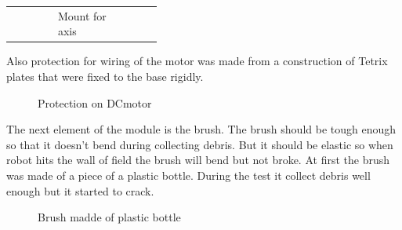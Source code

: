 \begin{center}
\begin{tabular}{|p{0.14\linewidth}|p{0.12\linewidth}|p{0.12\linewidth}|}
			\hline & Mount for axis  &
		\end{tabular}
	\end{center}
	Also protection for wiring of the motor was made from a construction of Tetrix plates that were fixed to the base rigidly.
\begin{figure}[H]
		\begin{minipage}[h]{\linewidth}
			\caption{Protection on DCmotor}
		\end{minipage}
	\end{figure}
	The next element of the module is the brush. The brush should be tough enough so that it doesn't bend during collecting debris. But it should be elastic so when robot hits the wall of field the brush will bend but not broke.\newline
	At first the brush was made of a piece of a plastic bottle. During the test it collect debris well enough but it started to crack.
	\begin{figure}[H]
		\begin{minipage}[h]{1\linewidth}
			\caption{Brush madde of plastic bottle}
		\end{minipage}
	\end{figure}
